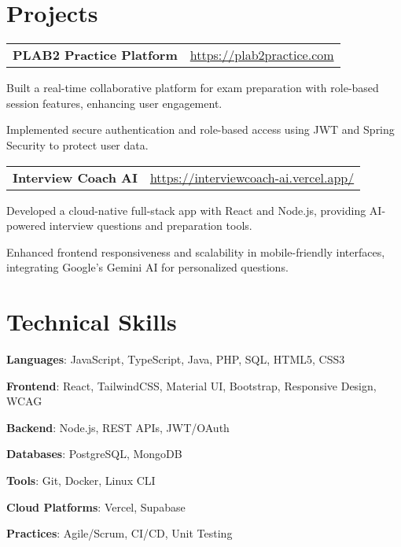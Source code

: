 \documentclass[letterpaper, 10pt]{article}
\makeatletter
\newcommand{\resumeItem}[1]{\item #1 }
\newcommand{\resumeSubItem}[2]{\resumeItem{\textbf{#1}{: #2 \vspace{-2pt}}}}
\newcommand{\resumeProjectHeading}[2]{
  \vspace{-1pt}\item
    \begin{tabular*}{0.97\textwidth}{l@{\extracolsep{\fill}}r}
      \textbf{#1} & \url{#2} \\
    \end{tabular*}\vspace{-5pt}
}
\newcommand{\resumeTechSkill}[2]{\resumeSubItem{#1}{#2}}
\makeatother
\begin{document}
\section{Projects}
\resumeProjectHeading{PLAB2 Practice Platform}{https://plab2practice.com}
\resumeItemListStart
\resumeItem{Built a real-time collaborative platform for exam preparation with role-based session features, enhancing user engagement.}
\resumeItem{Implemented secure authentication and role-based access using JWT and Spring Security to protect user data.}
\resumeItemListEnd

\resumeProjectHeading{Interview Coach AI}{https://interviewcoach-ai.vercel.app/}
\resumeItemListStart
\resumeItem{Developed a cloud-native full-stack app with React and Node.js, providing AI-powered interview questions and preparation tools.}
\resumeItem{Enhanced frontend responsiveness and scalability in mobile-friendly interfaces, integrating Google’s Gemini AI for personalized questions.}
\resumeItemListEnd

\section{Technical Skills}
\resumeTechSkill{Languages}{JavaScript, TypeScript, Java, PHP, SQL, HTML5, CSS3}
\resumeTechSkill{Frontend}{React, TailwindCSS, Material UI, Bootstrap, Responsive Design, WCAG}
\resumeTechSkill{Backend}{Node.js, REST APIs, JWT/OAuth}
\resumeTechSkill{Databases}{PostgreSQL, MongoDB}
\resumeTechSkill{Tools}{Git, Docker, Linux CLI}
\resumeTechSkill{Cloud Platforms}{Vercel, Supabase}
\resumeTechSkill{Practices}{Agile/Scrum, CI/CD, Unit Testing}
\end{document}
